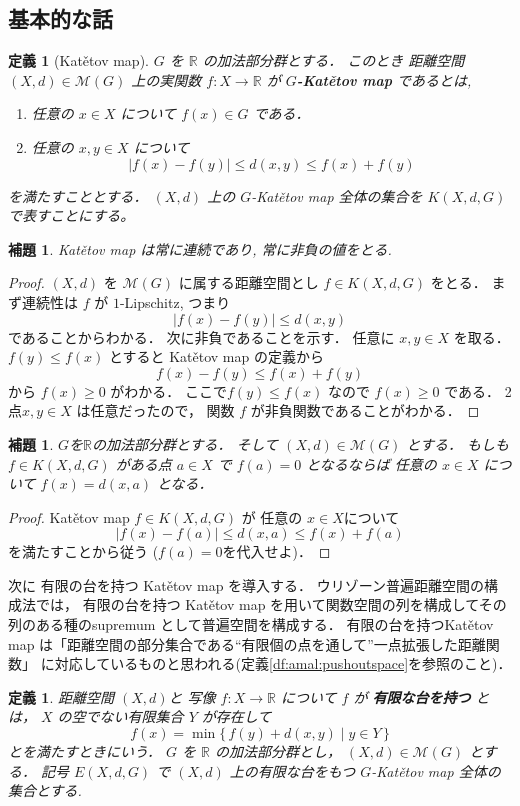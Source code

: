 \documentclass[leqno, 12pt]{jsarticle}
\newtheorem{lem}[thm]{補題}
\newtheorem{df}[thm]{定義}
\newcommand{\rr}{\mathbb{R}}
\begin{document}
\subsection{基本的な話}
\begin{df}[Kat\v{e}tov map]\label{df:katetov:katetovmap}
$G$
を
$\rr$
の加法部分群とする．
このとき
距離空間
$(X,d)\in \mathscr{M}(G)$
上の実関数
$f\colon X\to \rr$
が
\textbf{$G$-Kat\v{e}tov map}
であるとは,
\begin{enumerate}
\item 
任意の
$x\in X$
について
$f(x)\in G$
である．
\item 
任意の
$x, y\in X$
について
\[
|f(x)-f(y)|\le d(x,y)\le f(x)+f(y)
\]
\end{enumerate}
を満たすこととする．
$(X, d)$
上の
$G$-Kat\v{e}tov map
全体の集合を
$K(X, d, G)$
で表すことにする。
\end{df}

\begin{lem}\label{lem:katev:katproperty}
Kat\v{e}tov map 
は常に連続であり, 
常に非負の値をとる.
\end{lem}
\begin{proof}
$(X, d)$
を
$\mathscr{M}(G)$
に属する距離空間とし
$f\in K(X, d, G)$
をとる．
まず連続性は
$f$
が
$1$-Lipschitz, 
つまり
\[
|f(x)-f(y)|\le d(x, y)
\]
であることからわかる．
次に非負であることを示す．
任意に
$x, y\in X$
を取る．
$f(y)\le f(x)$
とすると
Kat\v{e}tov map
の定義から
\[
f(x)-f(y)\le f(x)+f(y)
\]
から
$f(x)\ge 0$
がわかる．
ここで$f(y)\le f(x)$
なので
$f(x)\ge 0$
である．
2点$x, y\in X$
は任意だったので，
関数
$f$
が非負関数であることがわかる．
\end{proof}


\begin{lem}\label{lem:katetov:onept}
$G$を$\rr$の加法部分群とする．
そして
$(X,d)\in \mathscr{M}(G)$
とする．
もしも
$f\in K(X, d, G)$
がある点
$a\in X$
で
$f(a)=0$
となるならば
任意の
$x\in X$
について
$f(x)=d(x, a)$
となる．
\end{lem}
\begin{proof}
Kat\v{e}tov map 
$f\in K(X, d, G)$
が
任意の
$x \in X$について
\[
|f(x)-f(a)|\le d(x, a)\le f(x)+f(a)
\]
を満たすことから従う
($f(a)=0$を代入せよ)．
\end{proof}


次に
有限の台を持つ
Kat\v{e}tov
map
を導入する．
ウリゾーン普遍距離空間の構成法では，
有限の台を持つ
Kat\v{e}tov
map
を用いて関数空間の列を構成してその列のある種のsupremum
として普遍空間を構成する．
有限の台を持つKat\v{e}tov
map
は「距離空間の部分集合である``有限個の点を通して''一点拡張した距離関数」
に対応しているものと思われる(定義\ref{df:amal:pushoutspace}を参照のこと)．
\begin{df}\label{df:katetov:finitesupport}
距離空間
$(X, d)$と
写像
$f\colon X\to \rr$
について
$f$
が
\textbf{有限な台を持つ}
とは，
$X$
の空でない有限集合
$Y$
が存在して
\[
f(x)=\min \{\, f(y)+d(x, y)\mid y\in Y\, \}
\]
とを満たすときにいう．
$G$
を
$\rr$
の加法部分群とし，
$(X, d)\in \mathscr{M}(G)$
とする．
記号
$E(X, d, G)$
で
$(X, d)$
上の有限な台をもつ
$G$-Kat\v{e}tov map
全体の集合とする.
\end{df}
\end{document}
